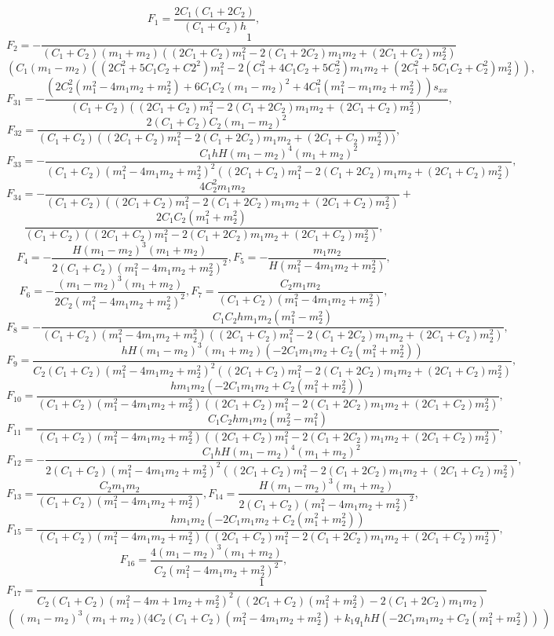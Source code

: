 \begin{small}
\[
F_1=\frac{2 C_1 (C_1 + 2 C_2)}{(C_1 + C_2) h},
\]
\[
F_2=-\frac{1}{(C_1 + C_2) (m_1 + m_2) ((2 C_1 + C_2) m_1^2 - 
	2 (C_1 + 2 C_2) m_1 m_2 + (2 C_1 + C_2) m_2^2)}
\]
\[
\left(C_1 (m_1 - m_2) ((2 C_1^2 + 5 C_1 C_2 + C2^2) m_1^2 - 
2 (C_1^2 + 4 C_1 C_2 + 5 C_2^2) m_1 m_2 + (2 C_1^2 + 5 C_1 C_2 + 
C_2^2) m_2^2)\right),
\]
\[
F_{31}=-\frac{(2 C_2^2 (m_1^2-4m_1 m_2+ m_2^2)+ 6 C_1 C_2 (m_1 - m_2)^2+   4 C_1^2 (m_1^2 - m_1 m_2 + m_2^2))s_{xx}
}{(C_1 + C_2) ((2 C_1 + C_2) m_1^2 -  2 (C_1 + 2 C_2) m_1 m_2 + (2 C_1 + C_2) m_2^2)} , 
\]
\[
F_{32}=\frac{ 2( C_1+C_2) C_2 (m_1 - m_2)^2
}{(C_1 + C_2) ((2 C_1 + C_2) m_1^2 - 
	2 (C_1 + 2 C_2) m_1 m_2 + (2 C_1 + C_2) m_2^2))},
\]
\[
F_{33}=-\frac{C_1 h H  (m_1 - m_2)^4 (m_1 + m_2)^2}{(C_1 + C_2) (m_1^2 - 
	4 m_1 m_2 + m_2^2)^2 ((2 C_1 + C_2) m_1^2 - 
	2 (C_1 + 2 C_2) m_1 m_2 + (2 C_1 + C_2) m_2^2)},
\]
\[
F_{34}=-\frac{4 C_2^2 m_1 m_2}{(C_1 + C_2) ((2 C_1 + C_2) m_1^2 - 
	2 (C_1 + 2 C_2) m_1 m_2 + (2 C_1 + C_2) m_2^2)} +
\]
\[\frac{
	2 C_1 C_2 (m_1^2 + m_2^2)}{(C_1 + C_2) ((2 C_1 + C_2) m_1^2 - 
	2 (C_1 + 2 C_2) m_1 m_2 + (2 C_1 + C_2) m_2^2)},
\]
\[
F_4=-\frac{H  (m_1 - m_2)^3 (m_1 + m_2)}{2(C_1 + C_2) (m_1^2 - 4 m_1 m_2 + 
	m_2^2)^2},
F_5=-\frac{m_1 m_2}{H (m_1^2 - 4 m_1 m_2 + m_2^2)},
\]
\[
F_6=-\frac{(m_1 - m_2)^3 (m_1 + m_2) }{2 C_2 (m_1^2 - 4 m_1 m_2 + m_2^2)^2},
F_7=\frac{C_2  m_1 m_2 }{(C_1 + C_2) (m_1^2 - 4 m_1 m_2 + m_2^2)},
\]
\[
F_8=-\frac{C_1 C_2 h  m_1 m_2 (m_1^2 - m_2^2)}{(C_1 + C_2) (m_1^2 - 4 m_1 m_2 +
	m_2^2) ((2 C_1 + C_2) m_1^2 - 2 (C_1 + 2 C_2) m_1 m_2 + (2 C_1 + C_2) m_2^2)},
\]
\[
F_9=\frac{h H  (m_1 - m_2)^3 (m_1 + m_2) (-2 C_1 m_1 m_2 + 
	C_2 (m_1^2 + m_2^2))}{C_2 (C_1 + C_2) (m_1^2 - 4 m_1 m_2 + 
	m_2^2)^2 ((2 C_1 + C_2) m_1^2 - 2 (C_1 + 2 C_2) m_1 m_2 + (2 C_1 + C_2) m_2^2)
},
\]
\[
F_{10}=\frac{h  m_1 m_2 (-2 C_1 m_1 m_2 + C_2 (m_1^2 + m_2^2))}{(C_1 + 
	C_2) (m_1^2 - 4 m_1 m_2 + m_2^2) ((2 C_1 + C_2) m_1^2 - 
	2 (C_1 + 2 C_2) m_1 m_2 + (2 C_1 + C_2) m_2^2)},
\]
\[
F_{11}=\frac{C_1 C_2 h  m_1 m_2 (m_2^2-m_1^2) }{(C_1 + C_2) (m_1^2 - 
	4 m_1 m_2 + m_2^2) ((2 C_1 + C_2) m_1^2 - 
	2 (C_1 + 2 C_2) m_1 m_2 + (2 C_1 + C_2) m_2^2)},
\]
\[
F_{12}=-\frac{C_1 h H  (m_1 - m_2)^4 (m_1 + m_2)^2 }{2(C_1 + C_2) (m_1^2 - 
	4 m_1 m_2 + m_2^2)^2 ((2 C_1 + C_2) m_1^2 - 
	2 (C_1 + 2 C_2) m_1 m_2 + (2 C_1 + C_2) m_2^2)},
\]
\[
F_{13}=\frac{C_2  m_1 m_2 }{(C_1 + C_2) (m_1^2 - 4 m_1 m_2 + m_2^2)},
F_{14}=\frac{H  (m_1 - m_2)^3 (m_1 + m_2) }{2(C_1 + C_2) (m_1^2 - 4 m_1 m_2 + 
	m_2^2)^2},
\]
\[
F_{15}=\frac{h  m_1 m_2 (-2 C_1 m_1 m_2 + C_2 (m_1^2 + m_2^2)) }{(C_1 + 
	C_2) (m_1^2 - 4 m_1 m_2 + m_2^2) ((2 C_1 + C_2) m_1^2 - 
	2 (C_1 + 2 C_2) m_1 m_2 + (2 C_1 + C_2) m_2^2)},
\]
\[
F_{16}=\frac{4 (m_1 - m_2)^3 (m_1 + m_2)}{C_2 (m_1^2 - 4 m_1 m_2 + m_2^2)^2},
\]
\[
F_{17}=\frac{1}    {C_2 (C_1 + 
	C_2) (m_1^2 - 4 m+1 m_2 + m_2^2)^2 ((2 C_1 + C_2) (m_1^2+m_2^2) - 
	2 (C_1 + 2 C_2) m_1 m_2 )}
\]
\[
\left(\frac{}{} (m_1 - m_2)^3 (m_1 + m_2) (4 C_2 (C_1 + C_2) (m_1^2 - 4 m_1 m_2 + m_2^2) + 
k_1 q_1 h H (-2 C_1 m_1 m_2 + C_2 (m_1^2 + m_2^2)) \frac{}{} \right)
\]
\end{small}
